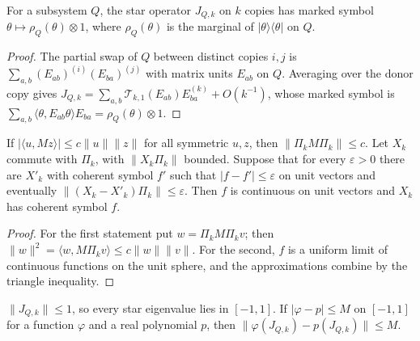 \begin{lemma}
    \label{lem:star_marked_symbol}
    \leanok
    For a subsystem $Q$, the star operator $J_{Q,k}$ on $k$ copies has marked symbol
    $\theta\mapsto\rho_Q(\theta)\otimes1$, where $\rho_Q(\theta)$ is the marginal of
    $|\theta\rangle\langle\theta|$ on $Q$.
\end{lemma}

\begin{proof}\leanok
    The partial swap of $Q$ between distinct copies $i,j$ is
    $\sum_{a,b}(E_{ab})^{(i)}(E_{ba})^{(j)}$ with matrix units $E_{ab}$ on $Q$. Averaging
    over the donor copy gives
    $J_{Q,k}=\sum_{a,b}\mathcal T_{k,1}(E_{ab})E_{ba}^{(k)}+O(k^{-1})$, whose marked symbol is
    $\sum_{a,b}\langle\theta,E_{ab}\theta\rangle E_{ba}=\rho_Q(\theta)\otimes1$.
\end{proof}

\begin{lemma}
    \label{lem:coherent_symbol_limit}
    \leanok
    If $|\langle u,Mz\rangle|\le c\|u\|\|z\|$ for all symmetric $u,z$, then
    $\|\Pi_kM\Pi_k\|\le c$. Let $X_k$ commute with $\Pi_k$, with $\|X_k\Pi_k\|$ bounded.
    Suppose that for every $\varepsilon>0$ there are $X'_k$ with coherent symbol $f'$ such
    that $|f-f'|\le\varepsilon$ on unit vectors and eventually
    $\|(X_k-X'_k)\Pi_k\|\le\varepsilon$. Then $f$ is continuous on unit vectors and $X_k$ has
    coherent symbol $f$.
\end{lemma}

\begin{proof}\leanok
    For the first statement put $w=\Pi_kM\Pi_kv$; then
    $\|w\|^2=\langle w,M\Pi_kv\rangle\le c\|w\|\|v\|$. For the second, $f$ is a uniform
    limit of continuous functions on the unit sphere, and the approximations combine by
    the triangle inequality.
\end{proof}

\begin{lemma}
    \label{lem:star_polynomial}
    \leanok
    $\|J_{Q,k}\|\le1$, so every star eigenvalue lies in $[-1,1]$. If
    $|\varphi-p|\le M$ on $[-1,1]$ for a function $\varphi$ and a real polynomial $p$, then
    $\|\varphi(J_{Q,k})-p(J_{Q,k})\|\le M$.
\end{lemma}

